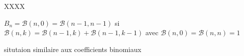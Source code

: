 XXXX

$B_n = \mathcal{B}(n, 0) = \mathcal{B}(n-1, n-1)$
si
$\mathcal{B}(n, k) = \mathcal{B}(n-1, k) + \mathcal{B}(n-1, k-1)$
avec
$\mathcal{B}(n, 0) = \mathcal{B}(n, n) = 1$

situtaion similaire aux coefficients binomiaux 